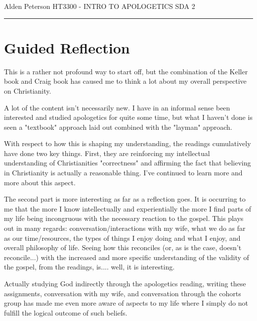 \documentclass[12pt]{turabian-researchpaper}
\begin{document}
\begin{singlespace}
\noindent Alden Peterson \newline
\noindent HT3300 - INTRO TO APOLOGETICS \newline
\noindent SDA 2 \newline
\noindent\rule{4cm}{0.4pt}
\end{singlespace}


\section{Guided Reflection}

This is a rather not profound way to start off, but the combination of the Keller book and Craig book has caused me to think a lot about my overall perspective on Christianity. 

A lot of the content isn't necessarily new. I have in an informal sense been interested and studied apologetics for quite some time, but what I haven't done is seen a "textbook" approach laid out combined with the "layman" approach.

With respect to how this is shaping my understanding, the readings cumulatively have done two key things. First, they are reinforcing my intellectual understanding of Christianities "correctness" and affirming the fact that believing in Christianity is actually a reasonable thing. I've continued to learn more and more about this aspect.

The second part is more interesting as far as a reflection goes. It is occurring to me that the more I know intellectually and experientially the more I find parts of my life being incongruous with the necessary reaction to the gospel. This plays out in many regards: conversation/interactions with my wife, what we do as far as our time/resources, the types of things I enjoy doing and what I enjoy, and overall philosophy of life. Seeing how this reconciles (or, as is the case, doesn't reconcile...) with the increased and more specific understanding of the validity of the gospel, from the readings, is.... well, it is interesting.

Actually studying God indirectly through the apologetics reading, writing these assignments, conversation with my wife, and conversation through the cohorts group has made me even more aware of aspects to my life where I simply do not fulfill the logical outcome of such beliefs.
\end{document}
